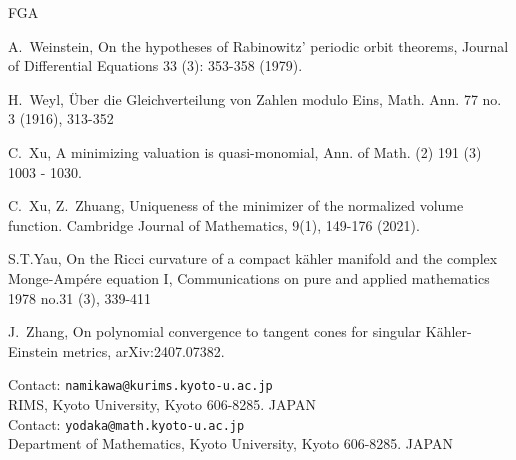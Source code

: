 \documentclass[12pt,a4paper]{amsart}
\theoremstyle{remark}
\theoremstyle{definition}
\begin{document}
\begin{thebibliography}{FGA}

A.~Weinstein, On the hypotheses of Rabinowitz' periodic orbit theorems, 
Journal of Differential Equations 33 (3): 
353-358 (1979). 

H.~Weyl, 
\"Uber die Gleichverteilung von Zahlen modulo Eins, 
Math. Ann. 77 no. 3 (1916), 313-352 

C.~Xu, 
A minimizing valuation is quasi-monomial, 
Ann. of Math. (2) 191 (3) 1003 - 1030. 

C.~Xu, Z.~Zhuang, 
Uniqueness of the minimizer of the normalized volume function. Cambridge Journal of Mathematics, 9(1), 149-176  (2021). 

S.T.Yau, 
On the Ricci curvature of a compact k\"ahler manifold and the complex 
Monge-Amp\'ere equation I, 
Communications on pure and applied mathematics 1978 no.31 (3), 339-411

J.~Zhang, On polynomial convergence to tangent cones for singular K\" ahler-Einstein metrics, 
arXiv:2407.07382. 









\end{thebibliography}

\vspace{3mm}
\footnotesize 
\noindent
Contact: {\tt namikawa@kurims.kyoto-u.ac.jp} \\
RIMS, Kyoto University, Kyoto 606-8285. JAPAN \\


\noindent
Contact: {\tt yodaka@math.kyoto-u.ac.jp} \\
Department of Mathematics, Kyoto University, Kyoto 606-8285. JAPAN \\
\end{document}
